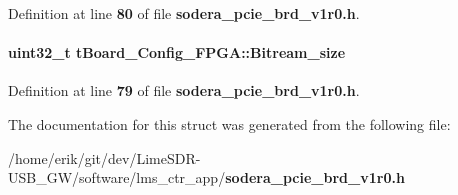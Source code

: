 Definition at line {\bf 80} of file {\bf sodera\+\_\+pcie\+\_\+brd\+\_\+v1r0.\+h}.

\paragraph[{Bitream\+\_\+size}]{\setlength{\rightskip}{0pt plus 5cm}uint32\+\_\+t t\+Board\+\_\+\+Config\+\_\+\+F\+P\+G\+A\+::\+Bitream\+\_\+size}\label{structtBoard__Config__FPGA_a8b2fcc193b78b1b109b44e493d587750}


Definition at line {\bf 79} of file {\bf sodera\+\_\+pcie\+\_\+brd\+\_\+v1r0.\+h}.



The documentation for this struct was generated from the following file\+:\begin{DoxyCompactItemize}
\item 
/home/erik/git/dev/\+Lime\+S\+D\+R-\/\+U\+S\+B\+\_\+\+G\+W/software/lms\+\_\+ctr\+\_\+app/{\bf sodera\+\_\+pcie\+\_\+brd\+\_\+v1r0.\+h}\end{DoxyCompactItemize}
